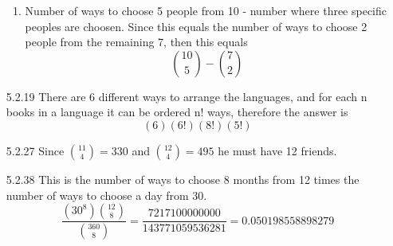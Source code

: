 \documentclass{article}
\begin{document}
\begin{enumerate}
\begin{enumerate}
\item
Number of ways to choose 5 people from 10 - number where three specific peoples are choosen. Since this equals the number of ways to choose 2 people from the remaining 7, then this equals
\[
{10 \choose 5} - {7 \choose 2} 
\]
\end{enumerate}

\item[5.2.19]
There are 6 different ways to arrange the languages, and for each n books in a language it can be ordered n! ways, therefore the answer is 
\[
(6)(6!)(8!)(5!)
\]

\item[5.2.27]
Since ${11 \choose 4} = 330$ and ${12 \choose 4} = 495$ he must have 12 friends. 

\item[5.2.38]
This is the number of ways to choose 8 months from 12 times the number of ways to choose a day from 30. 
\[
\frac{(30^8){12 \choose 8}}{{360 \choose 8}} = \frac{7217100000000}{143771059536281} = 0.050198558898279
\]
\end{enumerate}
\end{document}

